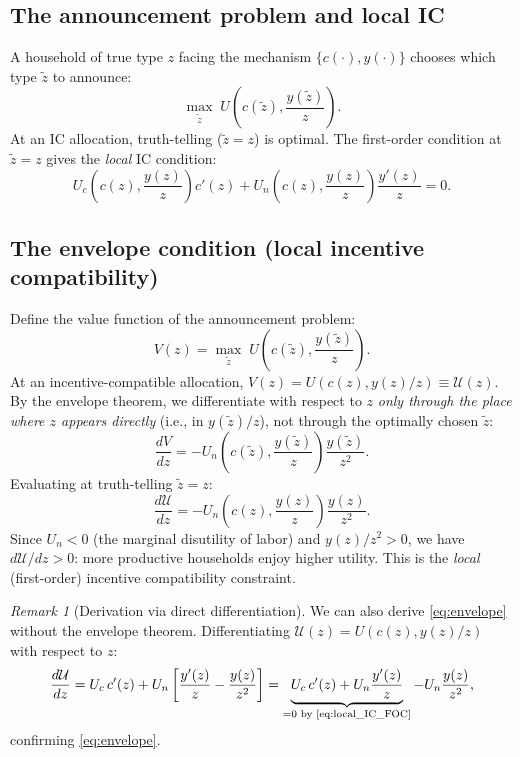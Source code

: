 \documentclass[12pt,a4paper]{article}
\theoremstyle{definition}
\theoremstyle{plain}
\theoremstyle{remark}
\newtheorem{remark}{Remark}[section]
\newcommand{\calU}{\mathcal{U}}
\begin{document}
\subsection{The announcement problem and local IC}

A household of true type $z$ facing the mechanism $\{c(\cdot), y(\cdot)\}$ chooses which type $\tilde z$ to announce:
\begin{equation}
\label{eq:announcement}
  \max_{\tilde z} \; U\!\left( c(\tilde z), \frac{y(\tilde z)}{z} \right).
\end{equation}
At an IC allocation, truth-telling ($\tilde z = z$) is optimal. The first-order condition at $\tilde z = z$ gives the \emph{local} IC condition:
\begin{equation}
\label{eq:local_IC_FOC}
  U_c\!\left( c(z), \frac{y(z)}{z} \right) c'(z)
  + U_n\!\left( c(z), \frac{y(z)}{z} \right) \frac{y'(z)}{z} = 0.
\end{equation}

\subsection{The envelope condition (local incentive compatibility)}

Define the value function of the announcement problem:
\[
  V(z) = \max_{\tilde z} \; U\!\left( c(\tilde z), \frac{y(\tilde z)}{z} \right).
\]
At an incentive-compatible allocation, $V(z) = U(c(z), y(z)/z) \equiv \calU(z)$. By the envelope theorem, we differentiate with respect to $z$ \emph{only through the place where $z$ appears directly} (i.e., in $y(\tilde z)/z$), not through the optimally chosen $\tilde z$:
\[
  \frac{dV}{dz} = -U_n\!\left( c(\tilde z), \frac{y(\tilde z)}{z} \right) \frac{y(\tilde z)}{z^2}.
\]
Evaluating at truth-telling $\tilde z = z$:
\begin{equation}
\label{eq:envelope}
  \boxed{
  \frac{d\calU}{dz} = -U_n\!\left( c(z), \frac{y(z)}{z} \right) \frac{y(z)}{z^2}.
  }
\end{equation}
Since $U_n < 0$ (the marginal disutility of labor) and $y(z)/z^2 > 0$, we have $d\calU/dz > 0$: more productive households enjoy higher utility. This is the \emph{local} (first-order) incentive compatibility constraint.

\begin{remark}[Derivation via direct differentiation]
We can also derive \eqref{eq:envelope} without the envelope theorem. Differentiating $\calU(z) = U(c(z), y(z)/z)$ with respect to $z$:
\[
  \frac{d\calU}{dz} = U_c \, c'(z) + U_n \left[ \frac{y'(z)}{z} - \frac{y(z)}{z^2} \right]
  = \underbrace{U_c \, c'(z) + U_n \frac{y'(z)}{z}}_{= 0 \text{ by \eqref{eq:local_IC_FOC}}}
  - U_n \frac{y(z)}{z^2},
\]
confirming \eqref{eq:envelope}.
\end{remark}
\end{document}
